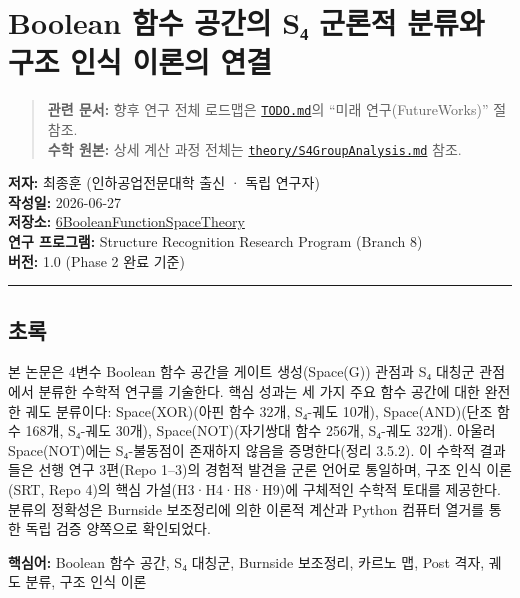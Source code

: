 \documentclass[
]{article}
\author{}
\date{}
\begin{document}
\section{Boolean 함수 공간의 S₄ 군론적 분류와 구조 인식 이론의
연결}\label{boolean-uxd568uxc218-uxacf5uxac04uxc758-sux2084-uxad70uxb860uxc801-uxbd84uxb958uxc640-uxad6cuxc870-uxc778uxc2dd-uxc774uxb860uxc758-uxc5f0uxacb0}

\begin{quote}
\textbf{관련 문서:} 향후 연구 전체 로드맵은
\href{TODO.md}{\texttt{TODO.md}}의 ``미래 연구(FutureWorks)'' 절 참조.\\
\textbf{수학 원본:} 상세 계산 과정 전체는
\href{theory/S4GroupAnalysis.md}{\texttt{theory/S4GroupAnalysis.md}}
참조.
\end{quote}

\textbf{저자:} 최종훈 (인하공업전문대학 출신 · 독립 연구자)\\
\textbf{작성일:} 2026-06-27\\
\textbf{저장소:}
\href{https://github.com/inha20/6BooleanFunctionSpaceTheory}{6BooleanFunctionSpaceTheory}\\
\textbf{연구 프로그램:} Structure Recognition Research Program (Branch
8)\\
\textbf{버전:} 1.0 (Phase 2 완료 기준)

\begin{center}\rule{0.5\linewidth}{0.5pt}\end{center}

\subsection{초록}\label{uxcd08uxb85d}

본 논문은 4변수 Boolean 함수 공간을 게이트 생성(Space(G)) 관점과 S₄
대칭군 관점에서 분류한 수학적 연구를 기술한다. 핵심 성과는 세 가지 주요
함수 공간에 대한 완전한 궤도 분류이다: Space(XOR)(아핀 함수 32개,
S₄-궤도 10개), Space(AND)(단조 함수 168개, S₄-궤도 30개),
Space(NOT)(자기쌍대 함수 256개, S₄-궤도 32개). 아울러 Space(NOT)에는
S₄-불동점이 존재하지 않음을 증명한다(정리 3.5.2). 이 수학적 결과들은
선행 연구 3편(Repo 1--3)의 경험적 발견을 군론 언어로 통일하며, 구조 인식
이론(SRT, Repo 4)의 핵심 가설(H3·H4·H8·H9)에 구체적인 수학적 토대를
제공한다. 분류의 정확성은 Burnside 보조정리에 의한 이론적 계산과 Python
컴퓨터 열거를 통한 독립 검증 양쪽으로 확인되었다.

\textbf{핵심어:} Boolean 함수 공간, S₄ 대칭군, Burnside 보조정리, 카르노
맵, Post 격자, 궤도 분류, 구조 인식 이론
\end{document}
